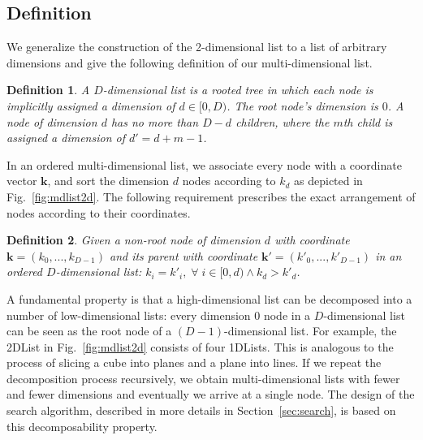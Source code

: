 \documentclass[10pt,journal,letterpaper,compsoc]{IEEEtran}
\newtheorem{definition}{Definition}
\newtheorem{theorem}{Theorem}
\begin{document}
\subsection{Definition}
We generalize the construction of the 2-dimensional list to a list of arbitrary dimensions and give the following definition of our multi-dimensional list.
\begin{definition}
\label{def:mdlist}
    A $D$-dimensional list is a rooted tree in which each node is implicitly assigned a dimension of $d \in [0,D)$. The root node's dimension is $0$. A node of dimension $d$ has no more than $D-d$ children, where the $m$th child is assigned a dimension of $d'=d+m-1$. 
\end{definition}

In an ordered multi-dimensional list, we associate every node with a coordinate vector $\mathbf{k}$, and sort the dimension $d$ nodes according to $k_d$ as depicted in Fig.~\ref{fig:mdlist2d}.
The following requirement prescribes the exact arrangement of nodes according to their coordinates.

\theoremstyle{definition}
\begin{definition}
\label{def:mdlistsort}
    Given a non-root node of dimension $d$ with coordinate $\mathbf{k}=(k_0,...,k_{D-1})$ and its parent with coordinate $\mathbf{k'}=(k'_0,...,k'_{D-1})$ in an ordered $D$-dimensional list: $k_i = k'_i, \;\forall \;i \in [0, d) \land k_d > k'_d$.
\end{definition}

A fundamental property is that a high-dimensional list can be decomposed into a number of low-dimensional lists: every dimension 0 node in a $D$-dimensional list can be seen as the root node of a $(D-1)$-dimensional list.
For example, the 2DList in Fig.~\ref{fig:mdlist2d} consists of four 1DLists.
This is analogous to the process of slicing a cube into planes and a plane into lines.
If we repeat the decomposition process recursively, we obtain multi-dimensional lists with fewer and fewer dimensions and eventually we arrive at a single node.
The design of the search algorithm, described in more details in Section~\ref{sec:search}, is based on this decomposability property.

\end{document}
